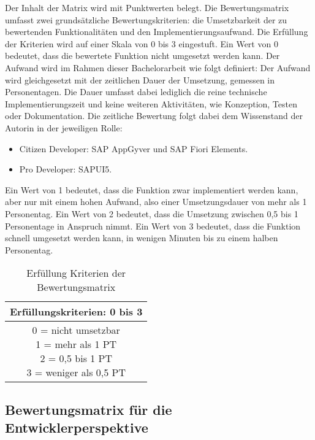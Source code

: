 Der Inhalt der Matrix wird mit Punktwerten belegt. Die Bewertungsmatrix umfasst zwei grundsätzliche Bewertungskriterien: die Umsetzbarkeit der zu bewertenden Funktionalitäten und den Implementierungsaufwand. Die Erfüllung der Kriterien wird auf einer Skala von 0 bis 3 eingestuft. Ein Wert von 0 bedeutet, dass die bewertete Funktion nicht umgesetzt werden kann. Der Aufwand wird im Rahmen dieser Bachelorarbeit wie folgt definiert: Der Aufwand wird gleichgesetzt mit der zeitlichen Dauer der Umsetzung, gemessen in Personentagen. Die Dauer umfasst dabei lediglich die reine technische Implementierungszeit und keine weiteren Aktivitäten, wie Konzeption, Testen oder Dokumentation. Die zeitliche Bewertung folgt dabei dem Wissenstand der Autorin in der jeweiligen Rolle:

\begin{itemize}[noitemsep]
\item Citizen Developer: SAP AppGyver und SAP Fiori Elements.
\item Pro Developer: SAPUI5.
\end{itemize}

Ein Wert von 1 bedeutet, dass die Funktion zwar implementiert werden kann, aber nur mit einem hohen Aufwand, also einer Umsetzungsdauer von mehr als 1 Personentag. Ein Wert von 2 bedeutet, dass die Umsetzung zwischen 0,5 bis 1 Personentage in Anspruch nimmt. Ein Wert von 3 bedeutet, dass die Funktion schnell umgesetzt werden kann, in wenigen Minuten bis zu einem halben Personentag.

\begin{table}[htbp]
    \centering
    \begin{tabular}{| c |}
        \hline
        \rowcolor{mygrey2} Erfüllungskriterien: 0 bis 3  \\
        \hline
        \makecell[l]{0 = nicht umsetzbar \\ 1 = mehr als 1 PT \\ 2 = 0,5 bis 1 PT \\ 3 = weniger als 0,5 PT}  \\
        \hline
    \end{tabular}
 \caption{Erfüllung Kriterien der Bewertungsmatrix} 
\end{table}

\subsection{Bewertungsmatrix für die Entwicklerperspektive}

